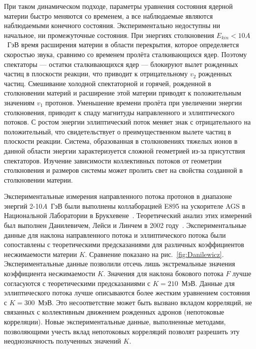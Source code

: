 При таком динамическом подходе, параметры уравнения состояния ядерной материи быстро меняются со временем, а все наблюдаемые являются наблюдаемыми конечного состояния. 
Экспериментально недоступны ни начальное, ни промежуточные состояния. 
При энергиях столкновения $E_{kin}<10A$~ГэВ время расширения материи в области перекрытия, которое определяется скоростью звука, сравнимо со временем пролёта сталкивающихся ядер.
Поэтому спектаторы --- остатки сталкивающихся ядер --- блокируют вылет рожденных частиц в плоскости реакции, что приводит к отрицательному $v_2$ рожденных частиц. 
Смешивание холодной спектаторной и горячей, рожденной в столкновении материй и расширение этой материи приводят к положительным значениям $v_1$ протонов.
Уменьшение времени пролёта при увеличении энергии столкновения, приводит к спаду магнитуды направленного и эллиптического потоков. 
С ростом энергии эллиптический поток меняет знак с отрицательного на положительный, что свидетельствует о преимущественном вылете частиц в плоскости реакции.
Система, образованная в столкновениях тяжелых ионов в данной области энергии характеризуется сложной геометрией из-за присутствия спектаторов.
Изучение зависимости коллективных потоков от геометрии столкновения и размеров системы может пролить свет на свойства созданной в столкновении материи.

Экспериментальные измерения направленного потока протонов в диапазоне энергий 2-10$A$~ГэВ были выполнены коллаборацией E895 на ускорителе AGS в Национальной Лаборатории в Брукхевене~\cite{E895:2000maf}. 
Теоретический анализ этих измерений был выполнен Данилевичем, Лейси и Линчем в 2002 году~\cite{Danielewicz:2002pu}.
Экспериментальные данные для наклона направленного потока и эллиптического потока были сопоставлены с теоретическими предсказаниями для различных коэффициентов несжимаемости материи $K$.
Сравнение показано на рис.~\ref{fig:Danilewicz}. 
Экспериментальные данные позволили отсечь лишь экстремальные значения коэффициента несжимаемости $K$.
Значения для наклона бокового потока $F$ лучше согласуются с теоретическими предсказаниями с $K=210$~МэВ. 
Данные для эллиптического потока лучше описываются более жестким уравнением состояния с $K=300$~МэВ.
Это несоответствие может быть вызвано вкладом корреляций, не связанных с коллективным движением рожденных адронов (непотоковые корреляции).
Новые экспериментальные данные, выполненные методами, позволяющими учесть вклад непотоковых корреляций позволят разрешить эту неоднозначность полученных значений $K$.

